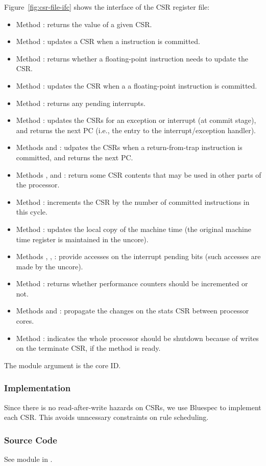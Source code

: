 Figure~\ref{fig:csr-file-ifc} shows the interface of the CSR register file:
\begin{itemize}
    \item Method : returns the value of a given CSR.
    \item Method : updates a CSR when a  instruction is committed.
    \item Method : returns whether a floating-point instruction needs to update the  CSR.
    \item Method : updates the  CSR when a a floating-point instruction is committed.
    \item Method : returns any pending interrupts.
    \item Method : updates the CSRs for an exception or interrupt (at commit stage), and returns the next PC (i.e., the entry to the interrupt/exception handler).
    \item Methods  and : udpates the CSRs when a return-from-trap instruction is committed, and returns the next PC.
    \item Methods ,  and : return some CSR contents that may be used in other parts of the processor.
    \item Method : increments the  CSR by the number of committed instructions in this cycle.
    \item Method : updates the local copy of the machine time (the original machine time register is maintained in the uncore).
    \item Methods , , : provide accesses on the interrupt pending bits (such accesses are made by the uncore).
    \item Method : returns whether performance counters should be incremented or not.
    \item Methods  and : propagate the changes on the stats CSR between processor cores.
    \item Method : indicates the whole processor should be shutdown because of writes on the terminate CSR, if the method is ready.
\end{itemize}
The module argument  is the core ID.

\subsubsection{Implementation}
Since there is no read-after-write hazards on CSRs, we use Bluespec  to implement each CSR.
This avoids unncessary constraints on rule scheduling.

\subsubsection{Source Code}
See module  in .

